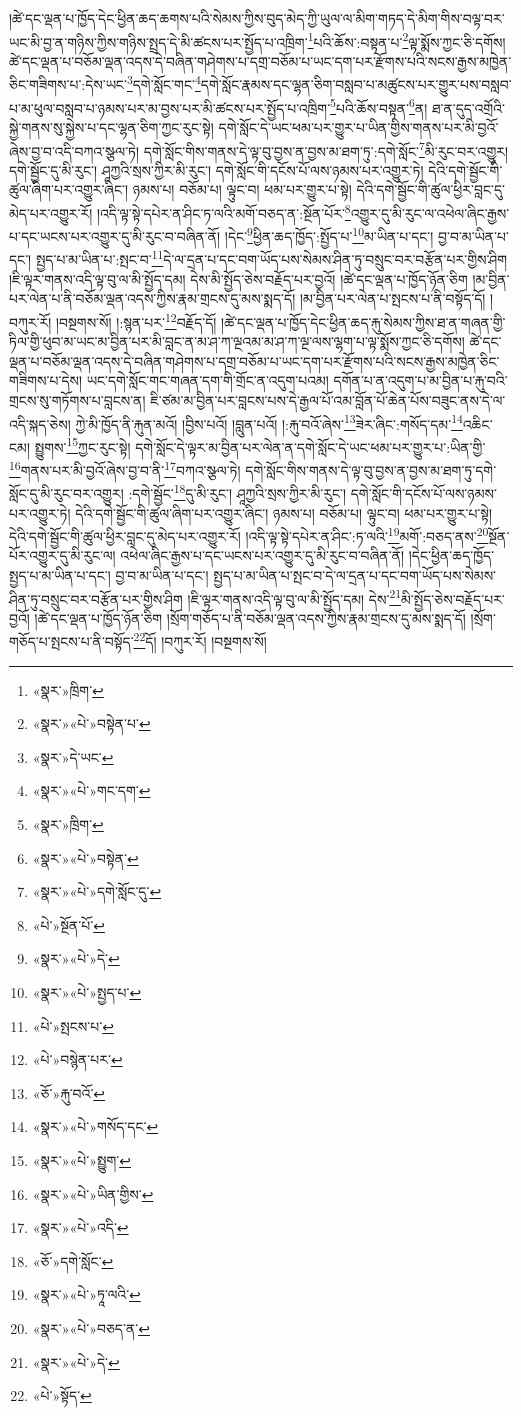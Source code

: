 །ཚེ་དང་ལྡན་པ་ཁྱོད་དེང་ཕྱིན་ཆད་ཆགས་པའི་སེམས་ཀྱིས་བུད་མེད་ཀྱི་ཡུལ་ལ་མིག་གཏད་དེ་མིག་གིས་བལྟ་བར་ཡང་མི་བྱ་ན་གཉིས་ཀྱིས་གཉིས་སྤྲད་དེ་མི་ཚངས་པར་སྤྱོད་པ་འཁྲིག་\footnote{«སྣར་»ཁྲིག་}པའི་ཆོས་:བསྟན་པ་\footnote{«སྣར་»«པེ་»བསྟེན་པ་}ལྟ་སྨོས་ཀྱང་ཅི་དགོས། ཚེ་དང་ལྡན་པ་བཅོམ་ལྡན་འདས་དེ་བཞིན་གཤེགས་པ་དགྲ་བཅོམ་པ་ཡང་དག་པར་རྫོགས་པའི་སངས་རྒྱས་མཁྱེན་ཅིང་གཟིགས་པ་:དེས་ཡང་\footnote{«སྣར་»དེ་ཡང་}དགེ་སློང་གང་\footnote{«སྣར་»«པེ་»གང་དག་}དགེ་སློང་རྣམས་དང་ལྷན་ཅིག་བསླབ་པ་མཚུངས་པར་གྱུར་པས་བསླབ་པ་མ་ཕུལ་བསླབ་པ་ཉམས་པར་མ་བྱས་པར་མི་ཚངས་པར་སྤྱོད་པ་འཁྲིག་\footnote{«སྣར་»ཁྲིག་}པའི་ཆོས་བསྟན་\footnote{«སྣར་»«པེ་»བསྟེན་}ན། ཐ་ན་དུད་འགྲོའི་སྐྱེ་གནས་སུ་སྐྱེས་པ་དང་ལྷན་ཅིག་ཀྱང་རུང་སྟེ། དགེ་སློང་དེ་ཡང་ཕམ་པར་གྱུར་པ་ཡིན་གྱིས་གནས་པར་མི་བྱའོ་ཞེས་བྱ་བ་འདི་བཀའ་སྩལ་ཏེ། དགེ་སློང་གིས་གནས་དེ་ལྟ་བུ་བྱས་ན་བྱས་མ་ཐག་ཏུ་:དགེ་སློང་\footnote{«སྣར་»«པེ་»དགེ་སློང་དུ་}མི་རུང་བར་འགྱུར། དགེ་སྦྱོང་དུ་མི་རུང་། ཤཱཀྱའི་སྲས་ཀྱིར་མི་རུང་། དགེ་སློང་གི་དངོས་པོ་ལས་ཉམས་པར་འགྱུར་ཏེ། དེའི་དགེ་སྦྱོང་གི་ཚུལ་ཞིག་པར་འགྱུར་ཞིང་། ཉམས་པ། བཅོམ་པ། ལྟུང་བ། ཕམ་པར་གྱུར་པ་སྟེ། དེའི་དགེ་སྦྱོང་གི་ཚུལ་ཕྱིར་བླང་དུ་མེད་པར་འགྱུར་རོ། །འདི་ལྟ་སྟེ་དཔེར་ན་ཤིང་ཏ་ལའི་མགོ་བཅད་ན་:སྔོན་པོར་\footnote{«པེ་»སྔོན་པོ་}འགྱུར་དུ་མི་རུང་ལ་འཕེལ་ཞིང་རྒྱས་པ་དང་ཡངས་པར་འགྱུར་དུ་མི་རུང་བ་བཞིན་ནོ། །དེང་\footnote{«སྣར་»«པེ་»དེ་}ཕྱིན་ཆད་ཁྱོད་:སྤྱོད་པ་\footnote{«སྣར་»«པེ་»སྤྱད་པ་}མ་ཡིན་པ་དང་། བྱ་བ་མ་ཡིན་པ་དང་། སྤྱད་པ་མ་ཡིན་པ་:སྤང་བ་\footnote{«པེ་»སྤངས་པ་}དེ་ལ་དྲན་པ་དང་བག་ཡོད་པས་སེམས་ཤིན་ཏུ་བསྲུང་བར་བརྩོན་པར་གྱིས་ཤིག །ཇི་ལྟར་གནས་འདི་ལྟ་བུ་ལ་མི་སྤྱོད་དམ། དེས་མི་སྤྱོད་ཅེས་བརྗོད་པར་བྱའོ། །ཚེ་དང་ལྡན་པ་ཁྱོད་ཉོན་ཅིག །མ་བྱིན་པར་ལེན་པ་ནི་བཅོམ་ལྡན་འདས་ཀྱིས་རྣམ་གྲངས་དུ་མས་སྨད་དོ། །མ་བྱིན་པར་ལེན་པ་སྤངས་པ་ནི་བསྟོད་དོ། །བཀུར་རོ། །བསྔགས་སོ། །:སྙན་པར་\footnote{«པེ་»བསྙེན་པར་}བརྗོད་དོ། །ཚེ་དང་ལྡན་པ་ཁྱོད་དེང་ཕྱིན་ཆད་རྐུ་སེམས་ཀྱིས་ཐ་ན་གཞན་གྱི་ཏིལ་གྱི་ཕུབ་མ་ཡང་མ་བྱིན་པར་མི་བླང་ན་མ་ཤ་ཀ་ལྔའམ་མ་ཤ་ཀ་ལྔ་ལས་ལྷག་པ་ལྟ་སྨོས་ཀྱང་ཅི་དགོས། ཚེ་དང་ལྡན་པ་བཅོམ་ལྡན་འདས་དེ་བཞིན་གཤེགས་པ་དགྲ་བཅོམ་པ་ཡང་དག་པར་རྫོགས་པའི་སངས་རྒྱས་མཁྱེན་ཅིང་གཟིགས་པ་དེས། ཡང་དགེ་སློང་གང་གཞན་དག་གི་གྲོང་ན་འདུག་པའམ། དགོན་པ་ན་འདུག་པ་མ་བྱིན་པ་རྐུ་བའི་གྲངས་སུ་གཏོགས་པ་བླངས་ན། ཇི་ཙམ་མ་བྱིན་པར་བླངས་པས་དེ་རྒྱལ་པོ་འམ་བློན་པོ་ཆེན་པོས་བཟུང་ནས་དེ་ལ་འདི་སྐད་ཅེས། ཀྱེ་མི་ཁྱོད་ནི་རྐུན་མའོ། །བྱིས་པའོ། །བླུན་པའོ། །:རྐུ་བའོ་ཞེས་\footnote{«ཅོ་»རྐུ་བའོ་}ཟེར་ཞིང་:གསོད་དམ་\footnote{«སྣར་»«པེ་»གསོད་དང་}འཆིང་ངམ། སྤྱུགས་\footnote{«སྣར་»«པེ་»སྤྱུག་}ཀྱང་རུང་སྟེ། དགེ་སློང་དེ་ལྟར་མ་བྱིན་པར་ལེན་ན་དགེ་སློང་དེ་ཡང་ཕམ་པར་གྱུར་པ་:ཡིན་གྱི་\footnote{«སྣར་»«པེ་»ཡིན་གྱིས་}གནས་པར་མི་བྱའོ་ཞེས་བྱ་བ་ནི་\footnote{«སྣར་»«པེ་»འདི་}བཀའ་སྩལ་ཏེ། དགེ་སློང་གིས་གནས་དེ་ལྟ་བུ་བྱས་ན་བྱས་མ་ཐག་ཏུ་དགེ་སློང་དུ་མི་རུང་བར་འགྱུར། :དགེ་སྦྱོང་\footnote{«ཅོ་»དགེ་སློང་}དུ་མི་རུང་། ཤཱཀྱའི་སྲས་ཀྱིར་མི་རུང་། དགེ་སློང་གི་དངོས་པོ་ལས་ཉམས་པར་འགྱུར་ཏེ། དེའི་དགེ་སྦྱོང་གི་ཚུལ་ཞིག་པར་འགྱུར་ཞིང་། ཉམས་པ། བཅོམ་པ། ལྟུང་བ། ཕམ་པར་གྱུར་པ་སྟེ། དེའི་དགེ་སྦྱོང་གི་ཚུལ་ཕྱིར་བླང་དུ་མེད་པར་འགྱུར་རོ། །འདི་ལྟ་སྟེ་དཔེར་ན་ཤིང་:ཏ་ལའི་\footnote{«སྣར་»«པེ་»ཏཱ་ལའི་}མགོ་:བཅད་ནས་\footnote{«སྣར་»«པེ་»བཅད་ན་}སྔོན་པོར་འགྱུར་དུ་མི་རུང་ལ། འཕེལ་ཞིང་རྒྱས་པ་དང་ཡངས་པར་འགྱུར་དུ་མི་རུང་བ་བཞིན་ནོ། །དེང་ཕྱིན་ཆད་ཁྱོད་སྤྱད་པ་མ་ཡིན་པ་དང་། བྱ་བ་མ་ཡིན་པ་དང་། སྤྱད་པ་མ་ཡིན་པ་སྤང་བ་དེ་ལ་དྲན་པ་དང་བག་ཡོད་པས་སེམས་ཤིན་ཏུ་བསྲུང་བར་བརྩོན་པར་གྱིས་ཤིག །ཇི་ལྟར་གནས་འདི་ལྟ་བུ་ལ་མི་སྤྱོད་དམ། དེས་\footnote{«སྣར་»«པེ་»དེ་}མི་སྤྱོད་ཅེས་བརྗོད་པར་བྱའོ། །ཚེ་དང་ལྡན་པ་ཁྱོད་ཉོན་ཅིག །སྲོག་གཅོད་པ་ནི་བཅོམ་ལྡན་འདས་ཀྱིས་རྣམ་གྲངས་དུ་མས་སྨད་དོ། །སྲོག་གཅོད་པ་སྤངས་པ་ནི་བསྟོད་\footnote{«པེ་»སྟོད་}དོ། །བཀུར་རོ། །བསྔགས་སོ། 